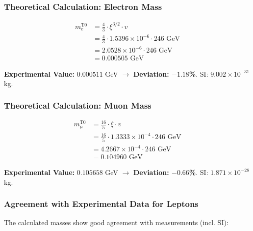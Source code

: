 	\subsubsection{Theoretical Calculation: Electron Mass}

	\begin{align}
		m_e^{\text{T0}} &= \frac{4}{3} \cdot \xi^{3/2} \cdot v \\
		&= \frac{4}{3} \cdot 1.5396 \times 10^{-6} \cdot 246 \text{ GeV} \\
		&= 2.0528 \times 10^{-6} \cdot 246 \text{ GeV} \\
		&= 0.000505 \text{ GeV}
	\end{align}

	\textbf{Experimental Value:} $0.000511$ GeV $\rightarrow$ \textbf{Deviation: $-1.18$\%}. SI: $9.002 \times 10^{-31}$ kg.

	\subsubsection{Theoretical Calculation: Muon Mass}

	\begin{align}
		m_\mu^{\text{T0}} &= \frac{16}{5} \cdot \xi \cdot v \\
		&= \frac{16}{5} \cdot 1.3333 \times 10^{-4} \cdot 246 \text{ GeV} \\
		&= 4.2667 \times 10^{-4} \cdot 246 \text{ GeV} \\
		&= 0.104960 \text{ GeV}
	\end{align}

	\textbf{Experimental Value:} $0.105658$ GeV $\rightarrow$ \textbf{Deviation: $-0.66$\%}. SI: $1.871 \times 10^{-28}$ kg.
	
	\subsubsection{Agreement with Experimental Data for Leptons}
	
	The calculated masses show good agreement with measurements (incl. SI):
	
